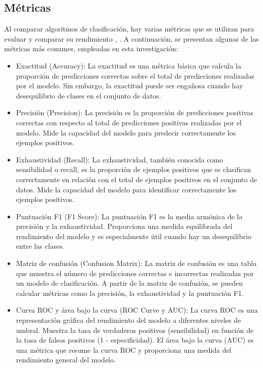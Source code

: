 \subsection{Métricas}
Al comparar algoritmos de clasificación, hay varias métricas que se utilizan para evaluar y comparar su rendimiento \citep{geron2022hands}, \citep{hastie2009elements}. A continuación, se presentan algunas de las métricas más comunes, empleadas en esta investigación:
\begin{itemize}
	\item Exactitud (Accuracy): La exactitud es una métrica básica que calcula la proporción de predicciones correctas sobre el total de predicciones realizadas por el modelo. Sin embargo, la exactitud puede ser engañosa cuando hay desequilibrio de clases en el conjunto de datos.
	\item Precisión (Precision): La precisión es la proporción de predicciones positivas correctas con respecto al total de predicciones positivas realizadas por el modelo. Mide la capacidad del modelo para predecir correctamente los ejemplos positivos.
	\item Exhaustividad (Recall): La exhaustividad, también conocida como sensibilidad o recall, es la proporción de ejemplos positivos que se clasifican correctamente en relación con el total de ejemplos positivos en el conjunto de datos. Mide la capacidad del modelo para identificar correctamente los ejemplos positivos.
	\item Puntuación F1 (F1 Score): La puntuación F1 es la media armónica de la precisión y la exhaustividad. Proporciona una medida equilibrada del rendimiento del modelo y es especialmente útil cuando hay un desequilibrio entre las clases.
	\item Matriz de confusión (Confusion Matrix): La matriz de confusión es una tabla que muestra el número de predicciones correctas e incorrectas realizadas por un modelo de clasificación. A partir de la matriz de confusión, se pueden calcular métricas como la precisión, la exhaustividad y la puntuación F1.
	\item Curva ROC y área bajo la curva (ROC Curve y AUC): La curva ROC es una representación gráfica del rendimiento del modelo a diferentes niveles de umbral. Muestra la tasa de verdaderos positivos (sensibilidad) en función de la tasa de falsos positivos (1 - especificidad). El área bajo la curva (AUC) es una métrica que resume la curva ROC y proporciona una medida del rendimiento general del modelo.
\end{itemize}

